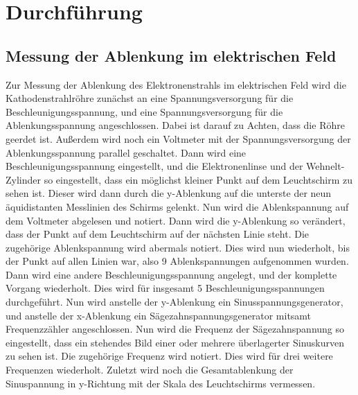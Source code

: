 \section{Durchführung}
\label{sec:Durchführung}
\subsection{Messung der Ablenkung im elektrischen Feld}
Zur Messung der Ablenkung des Elektronenstrahls im elektrischen Feld wird die Kathodenstrahlröhre zunächst an eine Spannungsversorgung für die Beschleunigungsspannung,
und eine Spannungsversorgung für die Ablenkungsspannung angeschlossen. Dabei ist darauf zu Achten, dass die Röhre geerdet ist.
Außerdem wird noch ein Voltmeter mit der Spannungsversorgung der Ablenkungsspannung parallel
geschaltet. Dann wird eine Beschleunigungsspannung eingestellt, und die Elektronenlinse und der Wehnelt-Zylinder so eingestellt, dass ein möglichst kleiner
Punkt auf dem Leuchtschirm zu sehen ist. Dieser wird dann durch die y-Ablenkung auf die unterste der neun äquidistanten Messlinien des Schirms gelenkt.
Nun wird die Ablenkspannung auf dem Voltmeter abgelesen und notiert.
Dann wird die y-Ablenkung so verändert, dass der Punkt auf dem Leuchtschirm auf der nächsten Linie steht. Die
zugehörige Ablenkspannung wird abermals notiert. Dies wird nun wiederholt, bis der Punkt auf allen Linien war, also 9 Ablenkspannungen aufgenommen wurden.
Dann wird eine andere Beschleunigungsspannung angelegt, und der komplette Vorgang wiederholt. Dies wird für insgesamt 5 Beschleunigungsspannungen durchgeführt.
Nun wird anstelle der y-Ablenkung ein Sinusspannungsgenerator, und anstelle der x-Ablenkung ein Sägezahnspannungsgenerator mitsamt Frequenzzähler angeschlossen.
Nun wird die Frequenz der Sägezahnspannung so eingestellt, dass ein stehendes Bild einer oder mehrere überlagerter Sinuskurven zu sehen ist.
Die zugehörige Frequenz wird notiert. Dies wird für drei weitere Frequenzen wiederholt. Zuletzt wird noch die Gesamtablenkung der Sinuspannung in y-Richtung mit
der Skala des Leuchtschirms vermessen.

